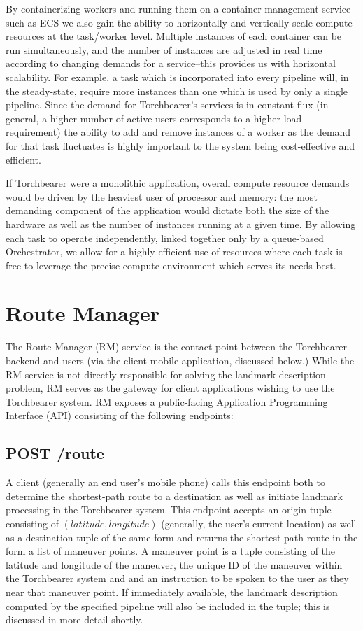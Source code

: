 By containerizing workers and running them on a container management service such as ECS we also gain the ability to horizontally and vertically scale compute resources at the task/worker level. Multiple instances of each container can be run simultaneously, and the number of instances are adjusted in real time according to changing demands for a service--this provides us with horizontal scalability. For example, a task which is incorporated into every pipeline will, in the steady-state, require more instances than one which is used by only a single pipeline. Since the demand for Torchbearer’s services is in constant flux (in general, a higher number of active users corresponds to a higher load requirement) the ability to add and remove instances of a worker as the demand for that task fluctuates is highly important to the system being cost-effective and efficient.

If Torchbearer were a monolithic application, overall compute resource demands would be driven by the heaviest user of processor and memory: the most demanding component of the application would dictate both the size of the hardware as well as the number of instances running at a given time. By allowing each task to operate independently, linked together only by a queue-based Orchestrator, we allow for a highly efficient use of resources where each task is free to leverage the precise compute environment which serves its needs best.

\section{Route Manager}
The Route Manager (RM) service is the contact point between the Torchbearer backend and users (via the client mobile application, discussed below.) While the RM service is not directly responsible for solving the landmark description problem, RM serves as the gateway for client applications wishing to use the Torchbearer system. RM exposes a public-facing Application Programming Interface (API) consisting of the following endpoints:

\subsection{POST /route}
A client (generally an end user's mobile phone) calls this endpoint both to determine the shortest-path route to a destination as well as initiate landmark processing in the Torchbearer system. This endpoint accepts an origin tuple consisting of $(latitude, longitude)$ (generally, the user’s current location) as well as a destination tuple of the same form and returns the shortest-path route in the form a list of maneuver points. A maneuver point is a tuple consisting of the latitude and longitude of the maneuver, the unique ID of the maneuver within the Torchbearer system and and an instruction to be spoken to the user as they near that maneuver point. If immediately available, the landmark description computed by the specified pipeline will also be included in the tuple; this is discussed in more detail shortly.


